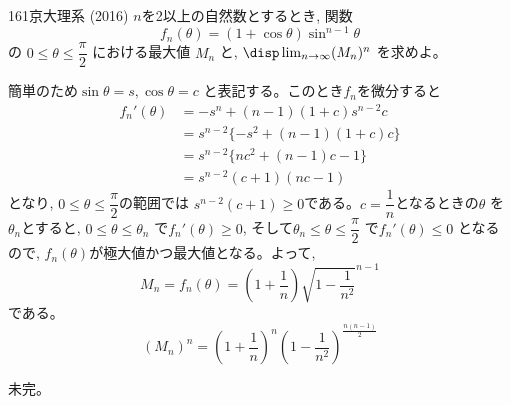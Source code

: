 \begin{thm}{161}{\maru}{京大理系 (2016)}
 $n$を2以上の自然数とするとき, 関数
\[f_n(\theta )= (1+\cos{\theta})\sin^{n-1}{\theta}\]
の $0\leq \theta\leq \dfrac{\pi}{2}$ における最大値 $M_n$ と, $\disp\lim_{n\to \infty} (M_n)^n$ を求めよ。
\end{thm}

簡単のため$\sin{\theta}=s, \cos{\theta}=c$ と表記する。このとき$f_n$を微分すると
\begin{align*}
 f_n'(\theta)&= -s^n + (n-1)(1+c)s^{n-2}c\\
 &=s^{n-2}\{-s^2 +(n-1)(1+c)c\}\\
 &=s^{n-2}\{nc^2 +(n-1)c -1\}\\
 &=s^{n-2}(c+1)(nc-1)
\end{align*}
となり, $0\leq \theta\leq \dfrac{\pi}{2}$の範囲では $s^{n-2}(c+1)\geq 0$である。$c=\dfrac{1}{n}$となるときの$\theta$ を $\theta_n$とすると, $0\leq \theta\leq \theta_n$ で$f_n'(\theta)\geq 0$, そして$\theta_n\leq \theta\leq \dfrac{\pi}{2} $ で$f_n'(\theta)\leq 0$ となるので, $f_n(\theta)$が極大値かつ最大値となる。よって,
\[M_n=f_n(\theta)=\left(1+\dfrac{1}{n}\right)\sqrt{1-\dfrac{1}{n^2}}^{n-1}\]
である。
\[(M_n)^n=\left(1+\dfrac{1}{n}\right)^n\left(1-\dfrac{1}{n^2}\right)^{\frac{n(n-1)}{2}}\]

未完。